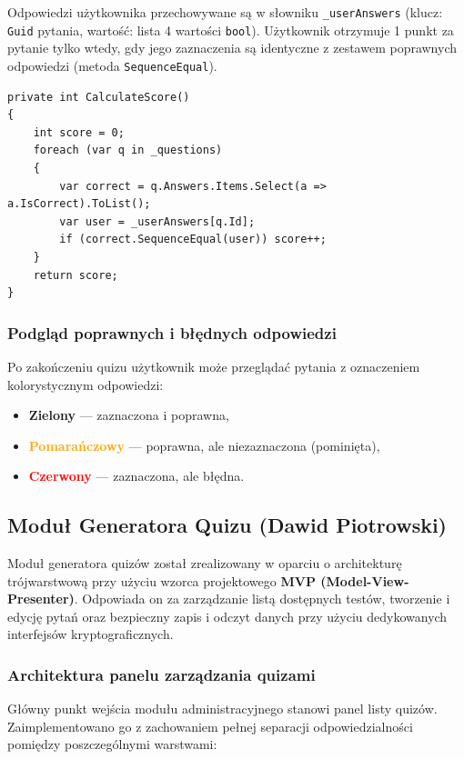 \documentclass[12pt,a4paper]{article}
\begin{document}
Odpowiedzi użytkownika przechowywane są w słowniku \texttt{\_userAnswers} (klucz: \texttt{Guid} pytania,
wartość: lista 4 wartości \texttt{bool}). Użytkownik otrzymuje 1 punkt za pytanie tylko wtedy,
gdy jego zaznaczenia są identyczne z zestawem poprawnych odpowiedzi (metoda \texttt{SequenceEqual}).

\begin{lstlisting}
private int CalculateScore()
{
    int score = 0;
    foreach (var q in _questions)
    {
        var correct = q.Answers.Items.Select(a => a.IsCorrect).ToList();
        var user = _userAnswers[q.Id];
        if (correct.SequenceEqual(user)) score++;
    }
    return score;
}
\end{lstlisting}

\subsubsection{Podgląd poprawnych i błędnych odpowiedzi}

Po zakończeniu quizu użytkownik może przeglądać pytania z oznaczeniem kolorystycznym odpowiedzi:
\begin{itemize}
    \item \textcolor{green!60!black}{\textbf{Zielony}} --- zaznaczona i poprawna,
    \item \textcolor{orange}{\textbf{Pomarańczowy}} --- poprawna, ale niezaznaczona (pominięta),
    \item \textcolor{red}{\textbf{Czerwony}} --- zaznaczona, ale błędna.
\end{itemize}



\subsection{Moduł Generatora Quizu (Dawid Piotrowski)}

Moduł generatora quizów został zrealizowany w oparciu o architekturę trójwarstwową przy użyciu wzorca projektowego \textbf{MVP (Model-View-Presenter)}. Odpowiada on za zarządzanie listą dostępnych testów, tworzenie i edycję pytań oraz bezpieczny zapis i odczyt danych przy użyciu dedykowanych interfejsów kryptograficznych.

\subsubsection{Architektura panelu zarządzania quizami}

Główny punkt wejścia modułu administracyjnego stanowi panel listy quizów. Zaimplementowano go z zachowaniem pełnej separacji odpowiedzialności pomiędzy poszczególnymi warstwami:
\end{document}
